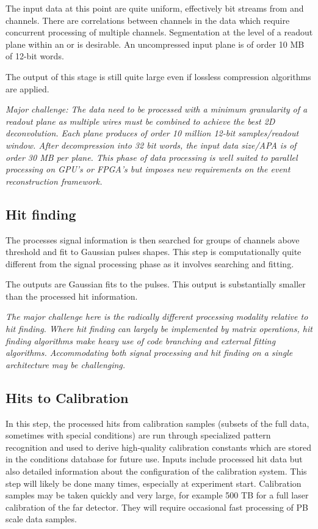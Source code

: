 \documentclass[../main-v1.tex]{subfiles}
\begin{document}
The input data at this point are quite uniform, effectively bit streams from  and  channels.  There are correlations between channels in the  data which require concurrent processing of multiple channels.  Segmentation at the level of a readout plane within an   or  is desirable.  An uncompressed input  plane is of order 10 MB of 12-bit words. 

The output of this stage is still quite large even if lossless compression algorithms are applied. 

{\it Major challenge: The  data need to be processed with a minimum granularity of a readout plane as multiple wires must be combined to achieve the best 2D deconvolution.  Each plane produces of order 10 million 12-bit samples/readout window. After decompression into 32 bit words, the input data size/APA is of order 30 MB per plane. This phase of data processing is well suited to parallel processing on GPU's or FPGA's but imposes new requirements on the event reconstruction framework. }

\subsection{Hit finding}
The processes signal information is then searched  for groups of  channels above threshold and fit to Gaussian pulses shapes.  This step is computationally quite different from the signal processing phase as it involves searching and fitting. 

The outputs are Gaussian fits to the pulses. This output is substantially smaller than the processed hit information. 

{\it The major challenge here is the radically different processing modality relative to hit finding.  Where hit finding can largely be implemented by matrix operations, hit finding algorithms make heavy use of code branching and external fitting algorithms. Accommodating both signal processing and hit finding on a single  architecture may be challenging. }

\subsection{Hits to Calibration }

In this step, the processed hits from calibration samples (subsets of the full data, sometimes with special conditions) are run through specialized pattern recognition and used to derive high-quality calibration constants which are stored in the conditions database for future use.  Inputs include processed hit data but also detailed information about the configuration of the calibration system.  This step will likely be done many times, especially at experiment start. Calibration samples may be taken quickly and very large, for example 500 TB for a full laser calibration of the far detector. They will require occasional fast processing of PB scale data samples. 
\end{document}
